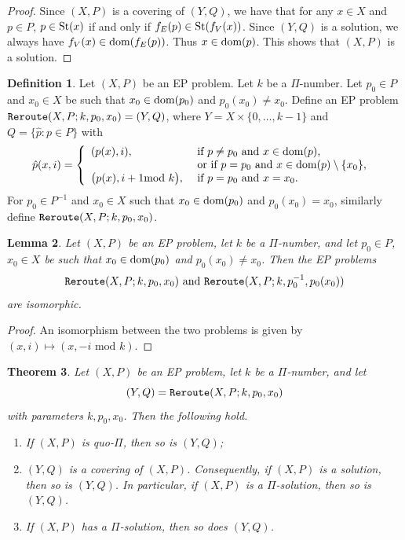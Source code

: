 \documentclass[10pt,a4paper]{amsart}
\newtheorem{theorem}{Theorem}[section]
\newtheorem{lemma}[theorem]{Lemma}
\theoremstyle{definition}
\newtheorem{definition}[theorem]{Definition}
\newcommand{\dom}{{\mbox{\rm dom}}}
\theoremstyle{definition}
\numberwithin{equation}{section}
\begin{document}
\begin{proof} Since $(X,P)$ is a covering of $(Y, Q)$, we have that for any $x\in X$ and $p\in P$, $p\in \mbox{\rm St}(x)$ if and only if $f_E(p)\in \mbox{\rm St}(f_V(x))$. Since $(Y, Q)$ is a solution, we always have $f_V(x)\in \dom(f_E(p))$. Thus $x\in \dom(p)$. This shows that $(X, P)$ is a solution.
\end{proof}


\begin{definition} \label{def:reroute}
Let $(X,P)$ be an EP problem. Let $k$ be a $\Pi$-number. Let $p_0\in P$ and $x_0\in X$ be such that $x_0\in\dom(p_0)$ and $p_0(x_0)\neq x_0$. Define an EP problem $\mbox{\tt Reroute}(X, P; k, p_0, x_0)=(Y, Q)$, where $Y=X\times\{0,\dots, k-1\}$ and $Q=\{\hat{p}\colon p\in P\}$ with
$$ \hat{p}(x, i)=\left\{\begin{array}{ll} (p(x), i), & \mbox{ if $p\neq p_0$ and $x\in \dom(p)$,} \\
& \mbox{ or if $p=p_0$ and $x\in \dom(p)\setminus\{x_0\}$, } \\
\big(p(x), i+1\!\!\!\!\mod{k}\big), & \mbox{ if $p=p_0$ and $x=x_0$.}
\end{array}\right.
$$
For $p_0\in P^{-1}$ and $x_0\in X$ such that $x_0\in \dom(p_0)$ and $p_0(x_0)=x_0$, similarly define $\mbox{\tt Reroute}(X, P; k, p_0, x_0)$.
\end{definition}

\begin{lemma}\label{lem:inverse} Let $(X, P)$ be an EP problem, let $k$ be a $\Pi$-number, and let $p_0\in P$, $x_0\in X$ be such that $x_0\in \dom(p_0)$ and $p_0(x_0)\neq x_0$. Then the EP problems 
$$\mbox{\tt Reroute}(X, P; k, p_0, x_0) \mbox{ and } \mbox{\tt Reroute}(X, P; k, p_0^{-1}, p_0(x_0))$$ are isomorphic.
\end{lemma}

\begin{proof} An isomorphism between the two problems is given by $(x,i)\mapsto (x, -i \mbox{ mod } k)$.
\end{proof}

\begin{theorem}\label{thm:reroute} Let $(X, P)$ be an EP problem, let $k$ be a $\Pi$-number, and let 
$$(Y, Q)=\mbox{\tt Reroute}(X, P; k, p_0, x_0)$$ with parameters $k, p_0, x_0$. Then the following hold.
\begin{enumerate}
\item[\rm (i)] If $(X, P)$ is quo-$\Pi$, then so is $(Y, Q)$;
\item[\rm (ii)] $(Y, Q)$ is a covering of $(X, P)$. Consequently, if $(X, P)$ is a solution, then so is $(Y, Q)$. In particular, if $(X,P)$ is a $\Pi$-solution, then so is $(Y, Q)$.
\item[\rm (iii)] If $(X, P)$ has a $\Pi$-solution, then so does $(Y,Q)$.
\end{enumerate}
\end{theorem}
\end{document}
